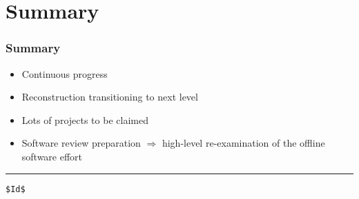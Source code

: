 \documentclass[xcolor=dvipsnames,hyperref={pdfpagelabels=false}]{beamer}
\newcommand{\bi}{\begin{itemize}}
\newcommand{\ei}{\end{itemize}}
\newcommand{\I}{\item}
\newcommand{\ft}{\frametitle}
\begin{document}
\section{Summary}

\begin{frame}[fragile]
\ft{Summary}
\bi
\I Continuous progress
\I Reconstruction transitioning to next level
\I Lots of projects to be claimed
\I Software review preparation $\Rightarrow$ high-level re-examination of the offline software effort
\ei
\vfill
\hrule
\tiny
\begin{verbatim}
$Id$
\end{verbatim}

\end{frame}
\end{document}
